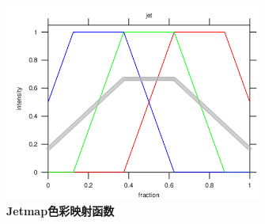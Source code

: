 \begin{figure}[h]
	\begin{center}
		\includegraphics[width=0.75\linewidth]{src/jetmap}
	\end{center}
	\caption{ \textbf{Jetmap色彩映射函数}}
	\label{fig:jetmap}	
\end{figure}